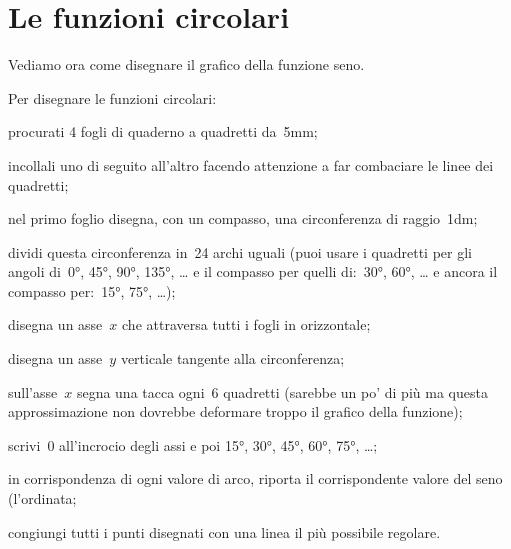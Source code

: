 \section{Le funzioni circolari}
\label{sec:gonio_funzionicircolari}
Vediamo ora come disegnare il grafico della funzione seno.

\begin{procedura}
 Per disegnare le funzioni circolari:
 \begin{enumeratea}
  \item procurati 4 fogli di quaderno a quadretti da~5mm;
  \item incollali uno di seguito all'altro 
   facendo attenzione a far combaciare le linee dei quadretti;
  \item nel primo foglio disegna, con un compasso, una circonferenza di
   raggio~1dm;
  \item dividi questa circonferenza in~24 archi uguali 
   (puoi usare i quadretti per gli angoli di~0°, 45°, 90°, 135°, \dots 
   e il compasso per quelli di:~30°, 60°, \dots
   e ancora il compasso per:~15°, 75°, \dots);
  \item disegna un asse~\(x\) che attraversa tutti i fogli in orizzontale;
  \item disegna un asse~\(y\) verticale tangente alla circonferenza;
  \item sull'asse~\(x\) segna una tacca ogni~6 quadretti 
   (sarebbe un po' di più ma questa approssimazione non dovrebbe deformare 
   troppo il grafico della funzione);
  \item scrivi~0 all'incrocio degli assi e poi 15°, 30°, 45°, 60°, 75°, \dots;
  \item in corrispondenza di ogni valore di arco, riporta il corrispondente
   valore del seno (l'ordinata;
  \item congiungi tutti i punti disegnati con una linea il più possibile 
   regolare.
 \end{enumeratea}
\end{procedura}

 \vspace{-6pt}
  \begin{center}
\begin{inaccessibleblock}
    
\end{inaccessibleblock}
  \end{center}

